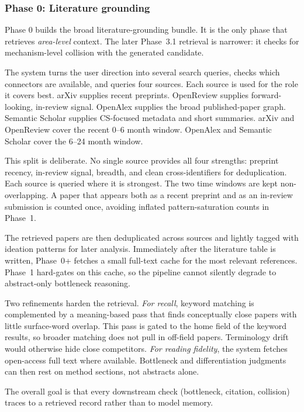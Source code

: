 \documentclass[10pt,a4paper]{article}
\begin{document}
\subsubsection{Phase 0: Literature grounding}

Phase 0 builds the broad literature-grounding bundle. It is the only phase that retrieves \emph{area-level} context. The later Phase~3.1 retrieval is narrower: it checks for mechanism-level collision with the generated candidate.

The system turns the user direction into several search queries, checks which connectors are available, and queries four sources. Each source is used for the role it covers best. arXiv supplies recent preprints. OpenReview supplies forward-looking, in-review signal. OpenAlex supplies the broad published-paper graph. Semantic Scholar supplies CS-focused metadata and short summaries. arXiv and OpenReview cover the recent 0--6 month window. OpenAlex and Semantic Scholar cover the 6--24 month window.

This split is deliberate. No single source provides all four strengths: preprint recency, in-review signal, breadth, and clean cross-identifiers for deduplication. Each source is queried where it is strongest. The two time windows are kept non-overlapping. A paper that appears both as a recent preprint and as an in-review submission is counted once, avoiding inflated pattern-saturation counts in Phase~1.

The retrieved papers are then deduplicated across sources and lightly tagged with ideation patterns for later analysis. Immediately after the literature table is written, Phase~0+ fetches a small full-text cache for the most relevant references. Phase~1 hard-gates on this cache, so the pipeline cannot silently degrade to abstract-only bottleneck reasoning.

Two refinements harden the retrieval. \emph{For recall}, keyword matching is complemented by a meaning-based pass that finds conceptually close papers with little surface-word overlap. This pass is gated to the home field of the keyword results, so broader matching does not pull in off-field papers. Terminology drift would otherwise hide close competitors. \emph{For reading fidelity}, the system fetches open-access full text where available. Bottleneck and differentiation judgments can then rest on method sections, not abstracts alone.

The overall goal is that every downstream check (bottleneck, citation, collision) traces to a retrieved record rather than to model memory.
\end{document}
